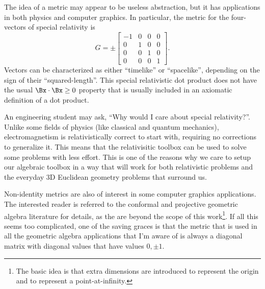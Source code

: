 The idea of a metric may appear to be useless abstraction, but it has applications in both physics and computer graphics.  In particular, the metric for the four-vectors of special relativity is
\begin{equation}\label{eqn:multivector:120}
G =
\pm
\begin{bmatrix}
-1 & 0 & 0 & 0 \\
0 & 1 & 0 & 0 \\
0 & 0 & 1 & 0 \\
0 & 0 & 0 & 1
\end{bmatrix}.
\end{equation}
Vectors can be characterized as either
``timelike'' or ``spacelike'', depending on the sign of their
``squared-length''.
This special relativistic dot product does not have the usual \( \Bx \cdot \Bx \ge 0 \) property that is usually included in an axiomatic definition of a dot product.

An engineering student may ask, ``Why would I care about special relativity?''.
Unlike some fields of physics (like classical and quantum mechanics), electromagnetism is relativistically correct to start with, requiring no corrections to generalize it.  This means that the relativisitic toolbox can be used to solve some problems with less effort.  This is one of the reasons why we care to setup our algebraic toolbox in a way that will work for both relativistic problems and the everyday 3D Euclidean geometry problems that surround us.

Non-identity metrics are also of interest in some computer graphics applications.  The interested reader is referred to the
conformal and projective geometric algebra literature for details, as the are beyond the scope of this work\footnote{The basic idea is that extra dimensions are introduced to represent the origin and to represent a point-at-infinity.}.
If all this seems too complicated, one of the saving graces is that the metric that is used in all the
geometric algebra applications that I'm aware of is always a
diagonal matrix with diagonal values that have values \( 0, \pm 1 \).
